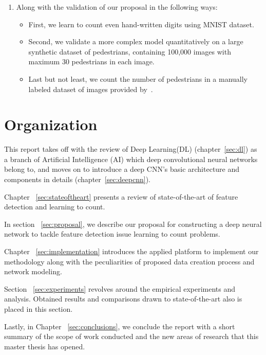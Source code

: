 \begin{enumerate}
	\item Along with the validation of our proposal in the following ways:
	\begin{itemize}
		\item First, we learn to count even hand-written digits using MNIST dataset. 
		\item Second, we validate a more complex model  quantitatively on a large synthetic dataset of pedestrians, containing 100,000 images with maximum 30 pedestrians in each image. 
		\item Last but not least, we count the number of pedestrians in a manually labeled dataset of images provided by~\citealt{chan2013ground}. 
	\end{itemize}
	
\end{enumerate}

\section{Organization}

This report takes off with the review of Deep Learning(DL) (chapter~\ref{sec:dl}) as a branch of Artificial Intelligence (AI) which deep convolutional neural networks belong to, and moves on to introduce a deep CNN's basic architecture and components in details (chapter~\ref{sec:deepcnn}). 


Chapter ~\ref{sec:stateoftheart} presents a review of state-of-the-art of feature detection and learning to count. 

In section ~\ref{sec:proposal}, we describe our proposal for constructing a deep neural network to tackle feature detection issue learning to count problems. 

Chapter ~\ref{sec:implementation} introduces the applied platform to implement our methodology  along with the peculiarities of proposed data creation process and network modeling. 

Section ~\ref{sec:experiments} revolves around the empirical experiments and analysis. Obtained results and comparisons drawn to state-of-the-art also is placed in this section.  

Lastly, in Chapter ~\ref{sec:conclusions}, we conclude the report with a short summary of the scope of work conducted and the new areas of research that this master thesis has opened.
